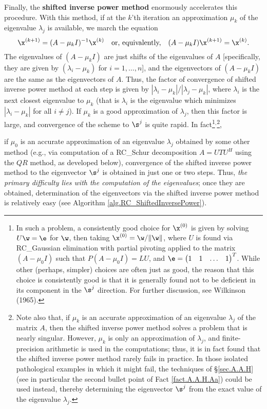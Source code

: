 Finally, the {\bf shifted inverse power method} enormously accelerates this procedure.
With this method, if at the $k$'th iteration an approximation $\mu_k$ of the eigenvalue $\lambda_{j}$ is available, we march the equation
\begin{equation}
\x^{(k+1)}=(A-\mu_k I)^{-1}\x^{(k)} \quad \textrm{or, equivalently,} \quad (A-\mu_k I)\x^{(k+1)}=\x^{(k)}.\label{eq.shiftedinversepowermethod}
\end{equation}
The eigenvalues of $(A-\mu_k I)$ are just shifts of the eigenvalues of $A$ [specifically, they are given by
$(\lambda_i-\mu_k)$ for $i=1,\ldots,n$], and the eigenvectors of $(A-\mu_k I)$ are the same as the eigenvectors of $A$.
Thus, the factor of convergence of shifted inverse power method at each step is given by $|\lambda_{i}-\mu_k|/|\lambda_{j}-\mu_k|$, where $\lambda_{i}$
is the next closest eigenvalue to $\mu_k$ (that is $\lambda_i$ is the eigenvalue which minimizes $|\lambda_{i}-\mu_k|$ for all $i\ne j$).
If $\mu_k$ is a good approximation of $\lambda_{j}$, then this factor is large, and convergence of the scheme to $\s^j$ is quite rapid.
In fact\footnote{In such a problem, a consistently good choice for $\x^{(0)}$ is given by solving $U\w=\e$ for $\w$, then taking $\x^{(0)}=\w/\Vert \w \Vert$, where
$U$ is found via RC_Gaussian elimination with partial pivoting applied to the matrix $(A-\mu_0 I)$
such that $P(A-\mu_0 I)=LU$, and
$\e=\begin{pmatrix} 1 & 1 & \ldots & 1\end{pmatrix}^T$. While other (perhaps, simpler) choices are often just as good,
the reason that this choice is consistently good is that
it is generally found not to be deficient in its component in the $\s^j$ direction.
For further discussion, see Wilkinson (1965).}${}^{,}$\footnote{Note also that, if $\mu_k$ is an accurate approximation of an eigenvalue $\lambda_j$
of the matrix $A$, then the shifted inverse power method solves a problem that is nearly singular.  However,
$\mu_k$ is only an approximation of $\lambda_j$, and finite-precision arithmetic is used in the computations;
thus, it is in fact found that the shifted inverse power method rarely fails in practice.
In those isolated pathological examples in which it might fail, the techniques of \S \ref{sec.A.A.H} (see in particular the second
bullet point of Fact \ref{fact.A.A.H.Aa}) could be used instead, thereby determining the eigenvector $\s^j$ from the exact value of the eigenvalue
$\lambda_j$.},
\beginmylistb
\item if $\mu_0$ is an accurate approximation of an eigenvalue $\lambda_{j}$ obtained by some other method (e.g., via computation of a RC_Schur
decomposition $A=UTU^H$ using the $QR$ method, as developed below), convergence of the shifted inverse power method
to the eigenvector $\s^j$ is obtained in just one or two steps.
\endmylist
Thus, {\it the primary difficulty lies with the computation of the eigenvalues}; once they are obtained, determination of the eigenvectors
via the shifted inverse power method is relatively easy (see Algorithm \ref{alg.RC_ShiftedInversePower}).

